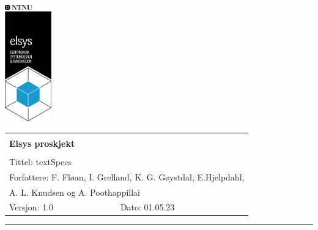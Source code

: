 \begin{minipage}[c]{0.15\textwidth}
\includegraphics[width=2.0cm]{Images/elsys_pos_staaende_ntnu.png}  
\end{minipage}
\begin{minipage}[c]{0.85\textwidth}
\renewcommand{\arraystretch}{1.7}
\large 
\begin{tabularx}{\textwidth}{|X|X|}
\hline
\multicolumn{2}{|l|}{} \\
\multicolumn{2}{|l|}{\huge \textbf{Elsys proskjekt}} \\
\multicolumn{2}{|l|}{}  \\
\hline
\multicolumn{2}{|l|}{Tittel: 
textSpecs
} \\
\hline
\multicolumn{2}{|l|}{Forfattere: 
F. Fløan, I. Grelland, K. G. Gøystdal, E.Hjelpdahl, 


} \\
\multicolumn{2}{|l|}{A. L. Knudsen og A. Poothappillai}  \\
\hline

Versjon: 1.0 & Dato: 01.05.23
\\
\hline 
\end{tabularx}
\end{minipage}
\normalsize


\newpage
\setlength{\parskip}{0ex}
\renewcommand{\baselinestretch}{0.1}\normalsize
\tableofcontents
\renewcommand{\baselinestretch}{1.00}\normalsize
\setlength{\parskip}{2ex}
\rule{\textwidth}{1pt}